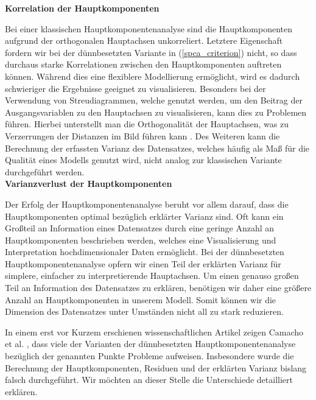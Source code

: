 \textbf{Korrelation der Hauptkomponenten}

Bei einer klassischen Hauptkomponentenanalyse sind die Hauptkomponenten aufgrund der orthogonalen Hauptachsen unkorreliert. Letztere Eigenschaft fordern wir bei der dünnbesetzten Variante in (\ref{spca_criterion}) nicht, so dass durchaus starke Korrelationen zwischen den Hauptkomponenten auftreten können. Während dies eine flexiblere Modellierung ermöglicht, wird es dadurch schwieriger die Ergebnisse geeignet zu visualisieren. Besonders bei der Verwendung von Streudiagrammen, welche genutzt werden, um den Beitrag der Ausgangsvariablen zu den Hauptachsen zu visualisieren, kann dies zu Problemen führen. Hierbei unterstellt man die Orthogonalität der Hauptachsen, was zu Verzerrungen der Distanzen im Bild führen kann \cite{geladi}. Des Weiteren kann die Berechnung der erfassten Varianz des Datensatzes, welches häufig als Maß für die Qualität eines Modells genutzt wird, nicht analog zur klassischen Variante durchgeführt werden.\\

\textbf{Varianzverlust der Hauptkomponenten}

Der Erfolg der Hauptkomponentenanalyse beruht vor allem darauf, dass die Hauptkomponenten optimal bezüglich erklärter Varianz sind. Oft kann ein Großteil an Information eines Datensatzes durch eine geringe Anzahl an Hauptkomponenten beschrieben werden, welches eine Visualisierung und Interpretation hochdimensionaler Daten ermöglicht. Bei der dünnbesetzten Hauptkomponentenanalyse opfern wir einen Teil der erklärten Varianz für simplere, einfacher zu interpretierende Hauptachsen. Um einen genauso großen Teil an Information des Datensatzes zu erklären, benötigen wir daher eine größere Anzahl an Hauptkomponenten in unserem Modell. Somit können wir die Dimension des Datensatzes unter Umständen nicht all zu stark reduzieren.

In einem erst vor Kurzem erschienen wissenschaftlichen Artikel zeigen Camacho et al. \cite{camacho}, dass viele der Varianten der dünnbesetzten Hauptkomponentenanalyse bezüglich der genannten Punkte Probleme aufweisen. Insbesondere wurde die Berechnung der Hauptkomponenten, Residuen und der erklärten Varianz bislang falsch durchgeführt. Wir möchten an dieser Stelle die Unterschiede detailliert erklären.

